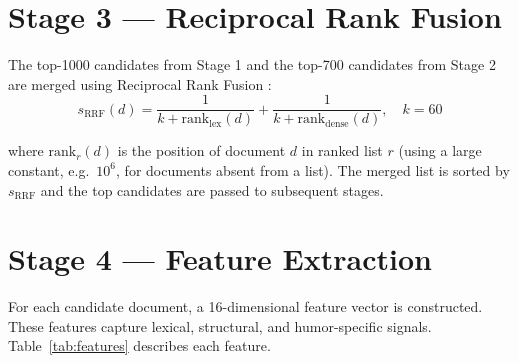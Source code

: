 \section{Stage 3 --- Reciprocal Rank Fusion}

The top-1000 candidates from Stage 1 and the top-700 candidates from Stage 2 are merged using Reciprocal Rank Fusion \cite{rrf}:
\begin{equation}
s_{\text{RRF}}(d) = \frac{1}{k + \text{rank}_{\text{lex}}(d)} + \frac{1}{k + \text{rank}_{\text{dense}}(d)}, \quad k = 60
\end{equation}

where $\text{rank}_r(d)$ is the position of document $d$ in ranked list $r$ (using a large constant, e.g.\ $10^6$, for documents absent from a list). The merged list is sorted by $s_{\text{RRF}}$ and the top candidates are passed to subsequent stages.

\section{Stage 4 --- Feature Extraction}

For each candidate document, a 16-dimensional feature vector is constructed. These features capture lexical, structural, and humor-specific signals. Table~\ref{tab:features} describes each feature.

